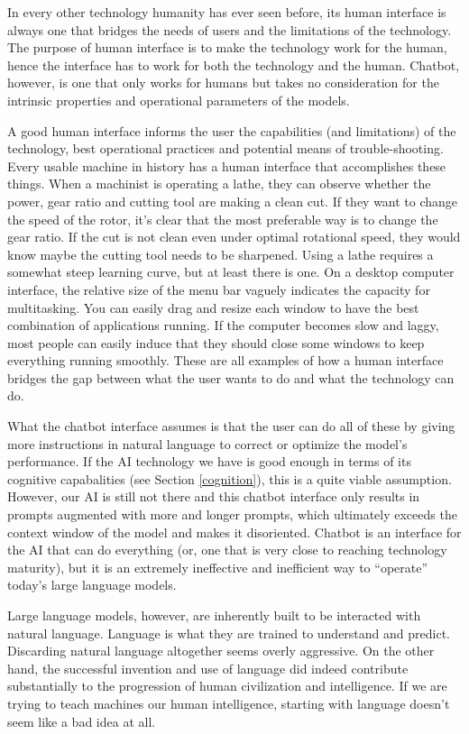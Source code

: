 \documentclass[12pt]{article}
\begin{document}
In every other technology humanity has ever seen before, its human interface is always one that bridges the needs of users and the limitations of the technology. The purpose of human interface is to make the technology work for the human, hence the interface has to work for both the technology and the human. Chatbot, however, is one that only works for humans but takes no consideration for the intrinsic properties and operational parameters of the models.

A good human interface informs the user the capabilities (and limitations) of the technology, best operational practices and potential means of trouble-shooting. Every usable machine in history has a human interface that accomplishes these things. When a machinist is operating a lathe, they can observe whether the power, gear ratio and cutting tool are making a clean cut. If they want to change the speed of the rotor, it's clear that the most preferable way is to change the gear ratio. If the cut is not clean even under optimal rotational speed, they would know maybe the cutting tool needs to be sharpened. Using a lathe requires a somewhat steep learning curve, but at least there is one. On a desktop computer interface, the relative size of the menu bar vaguely indicates the capacity for multitasking. You can easily drag and resize each window to have the best combination of applications running. If the computer becomes slow and laggy, most people can easily induce that they should close some windows to keep everything running smoothly. These are all examples of how a human interface bridges the gap between what the user wants to do and what the technology can do. 

What the chatbot interface assumes is that the user can do all of these by giving more instructions in natural language to correct or optimize the model's performance. If the AI technology we have is good enough in terms of its cognitive capabalities (see Section \ref{cognition}), this is a quite viable assumption. However, our AI is still not there and this chatbot interface only results in prompts augmented with more and longer prompts, which ultimately exceeds the context window of the model and makes it disoriented. Chatbot is an interface for the AI that can do everything (or, one that is very close to reaching technology maturity), but it is an extremely ineffective and inefficient way to ``operate'' today's large language models.

Large language models, however, are inherently built to be interacted with natural language. Language is what they are trained to understand and predict. Discarding natural language altogether seems overly aggressive. On the other hand, the successful invention and use of language did indeed contribute substantially to the progression of human civilization and intelligence. If we are trying to teach machines our human intelligence, starting with language doesn't seem like a bad idea at all.
\end{document}
